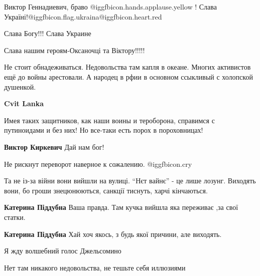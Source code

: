  
 
 
 
 
\zzSecCmt

\begin{itemize} %
Виктор Геннадиевич, браво @igg{fbicon.hands.applause.yellow} ! Слава
Україні!@igg{fbicon.flag.ukraina}@igg{fbicon.heart.red}

Слава Богу!!! Слава Украине

Слава нашим героям-Оксаночці та Віктору!!!!!


\obeycr
Не стоит обнадеживаться.
Недовольства там капля в океане.
Многих активистов ещё до войны арестовали.
А народец в рфии в основном ссыкливый с холопской душенкой.
\restorecr

\begin{itemize} %
\textbf{Cvit Lanka} 

Имея таких защитников, как наши воины и тероборона, справимся с путиноидами и
без них! Но все-таки есть порох в пороховницах!

\textbf{Виктор Киркевич}
Дай нам бог!
\end{itemize} %

Не рискнут переворот наверное к сожалению. @igg{fbicon.cry} 


Та не із-за війни вони вийшли на вулиці. \enquote{Нєт вайнє} - це лише лозунг. Виходять
вони, бо гроши знецюнюються, санкції тиснуть, харчі кінчаються.

\begin{itemize} %
\textbf{Катерина Піддубна} Ваша правда. Там кучка вийшла яка переживає ,за свої статки.

\textbf{Катерина Піддубна} Хай хоч якось, з будь якої причини, але виходять.
\end{itemize} %

Я жду волшебний голос Джельсомино

Нет там никакого недовольства, не тешьте себя иллюзиями


\end{itemize}

